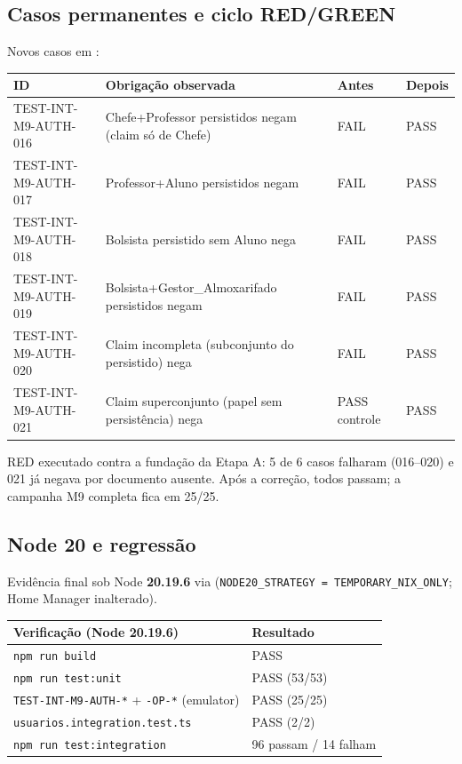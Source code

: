 \subsection{Casos permanentes e ciclo RED/GREEN}

Novos casos em
:

\small
\begin{longtable}{@{}p{}p{}p{}p{}@{}}
\toprule
ID & Obrigação observada & Antes & Depois \\
\midrule
\endhead
TEST-INT-M9-AUTH-016 & Chefe+Professor persistidos negam (claim só de Chefe) & FAIL & PASS \\
TEST-INT-M9-AUTH-017 & Professor+Aluno persistidos negam & FAIL & PASS \\
TEST-INT-M9-AUTH-018 & Bolsista persistido sem Aluno nega & FAIL & PASS \\
TEST-INT-M9-AUTH-019 & Bolsista+Gestor\_Almoxarifado persistidos negam & FAIL & PASS \\
TEST-INT-M9-AUTH-020 & Claim incompleta (subconjunto do persistido) nega & FAIL & PASS \\
TEST-INT-M9-AUTH-021 & Claim superconjunto (papel sem persistência) nega & PASS controle & PASS \\
\bottomrule
\end{longtable}
\normalsize

RED executado contra a fundação da Etapa A: 5 de 6 casos falharam (016--020) e
021 já negava por documento ausente. Após a correção, todos passam; a campanha
M9 completa fica em 25/25.

\subsection{Node 20 e regressão}

Evidência final sob Node \textbf{20.19.6} via
(\texttt{NODE20\_STRATEGY = TEMPORARY\_NIX\_ONLY}; Home Manager inalterado).

\small
\begin{longtable}{@{}p{}p{}@{}}
\toprule
Verificação (Node 20.19.6) & Resultado \\
\midrule
\endhead
\texttt{npm run build} & PASS \\
\texttt{npm run test:unit} & PASS (53/53) \\
\texttt{TEST-INT-M9-AUTH-*} + \texttt{-OP-*} (emulator) & PASS (25/25) \\
\texttt{usuarios.integration.test.ts} & PASS (2/2) \\
\texttt{npm run test:integration} & 96 passam / 14 falham \\
\bottomrule
\end{longtable}
\normalsize

